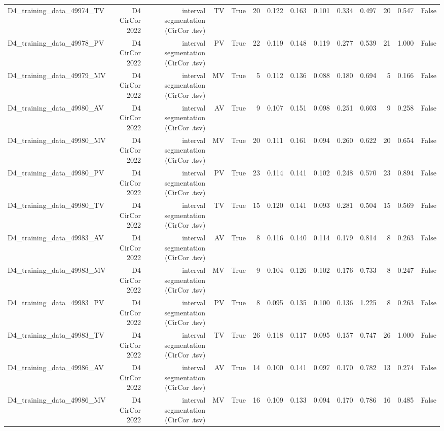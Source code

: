\begin{table}[htbp]
\begin{tabular}{lrrrrrrrrrrrrr}
    D4\_training\_data\_49974\_TV & D4 CirCor 2022 & interval segmentation (CirCor .tsv) & TV & True & 20 & 0.122 & 0.163 & 0.101 & 0.334 & 0.497 & 20 & 0.547 & False \\
    D4\_training\_data\_49978\_PV & D4 CirCor 2022 & interval segmentation (CirCor .tsv) & PV & True & 22 & 0.119 & 0.148 & 0.119 & 0.277 & 0.539 & 21 & 1.000 & False \\
    D4\_training\_data\_49979\_MV & D4 CirCor 2022 & interval segmentation (CirCor .tsv) & MV & True & 5 & 0.112 & 0.136 & 0.088 & 0.180 & 0.694 & 5 & 0.166 & False \\
    D4\_training\_data\_49980\_AV & D4 CirCor 2022 & interval segmentation (CirCor .tsv) & AV & True & 9 & 0.107 & 0.151 & 0.098 & 0.251 & 0.603 & 9 & 0.258 & False \\
    D4\_training\_data\_49980\_MV & D4 CirCor 2022 & interval segmentation (CirCor .tsv) & MV & True & 20 & 0.111 & 0.161 & 0.094 & 0.260 & 0.622 & 20 & 0.654 & False \\
    D4\_training\_data\_49980\_PV & D4 CirCor 2022 & interval segmentation (CirCor .tsv) & PV & True & 23 & 0.114 & 0.141 & 0.102 & 0.248 & 0.570 & 23 & 0.894 & False \\
    D4\_training\_data\_49980\_TV & D4 CirCor 2022 & interval segmentation (CirCor .tsv) & TV & True & 15 & 0.120 & 0.141 & 0.093 & 0.281 & 0.504 & 15 & 0.569 & False \\
    D4\_training\_data\_49983\_AV & D4 CirCor 2022 & interval segmentation (CirCor .tsv) & AV & True & 8 & 0.116 & 0.140 & 0.114 & 0.179 & 0.814 & 8 & 0.263 & False \\
    D4\_training\_data\_49983\_MV & D4 CirCor 2022 & interval segmentation (CirCor .tsv) & MV & True & 9 & 0.104 & 0.126 & 0.102 & 0.176 & 0.733 & 8 & 0.247 & False \\
    D4\_training\_data\_49983\_PV & D4 CirCor 2022 & interval segmentation (CirCor .tsv) & PV & True & 8 & 0.095 & 0.135 & 0.100 & 0.136 & 1.225 & 8 & 0.263 & False \\
    D4\_training\_data\_49983\_TV & D4 CirCor 2022 & interval segmentation (CirCor .tsv) & TV & True & 26 & 0.118 & 0.117 & 0.095 & 0.157 & 0.747 & 26 & 1.000 & False \\
    D4\_training\_data\_49986\_AV & D4 CirCor 2022 & interval segmentation (CirCor .tsv) & AV & True & 14 & 0.100 & 0.141 & 0.097 & 0.170 & 0.782 & 13 & 0.274 & False \\
    D4\_training\_data\_49986\_MV & D4 CirCor 2022 & interval segmentation (CirCor .tsv) & MV & True & 16 & 0.109 & 0.133 & 0.094 & 0.170 & 0.786 & 16 & 0.485 & False \\

\end{tabular}
\end{table}
